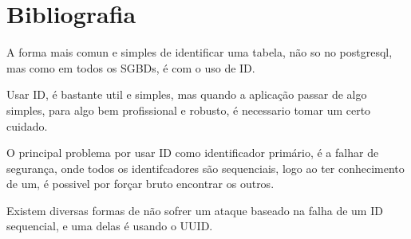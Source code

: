 \section{Bibliografia}
A forma mais comun e simples de identificar uma tabela, não so no postgresql, mas como em todos os SGBDs, é com o uso de ID.

Usar ID, é bastante util e simples, mas quando a aplicação passar de algo simples, para algo bem profissional e robusto, 
é necessario tomar um certo cuidado.

O principal problema por usar ID como identificador primário, é a falhar de segurança, onde todos os identifcadores são sequenciais,
logo ao ter conhecimento de um, é possivel por forçar bruto encontrar os outros.

Existem diversas formas de não sofrer um ataque baseado na falha de um ID sequencial, e uma delas é usando o UUID.
